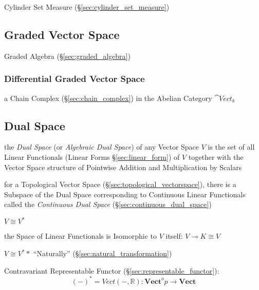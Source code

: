 Cylinder Set Measure (\S\ref{sec:cylinder_set_measure})



\subsection{Graded Vector Space}\label{sec:graded_vectorspace}

Graded Algebra (\S\ref{sec:graded_algebra})



\subsubsection{Differential Graded Vector Space}\label{sec:differential_graded}

a Chain Complex (\S\ref{sec:chain_complex}) in the Abelian Category
$\cat{Vect}_k$



\subsection{Dual Space}\label{sec:dual_space}

the \emph{Dual Space} (or \emph{Algebraic Dual Space}) of any Vector Space $V$
is the set of all Linear Functionals (Linear Forms \S\ref{sec:linear_form}) of
$V$ together with the Vector Space structure of Pointwise Addition and
Multiplication by Scalars

for a Topological Vector Space (\S\ref{sec:topological_vectorspace}), there is
a Subspace of the Dual Space corresponding to Continuous Linear Functionals
called the \emph{Continuous Dual Space} (\S\ref{sec:continuous_dual_space})

$V \cong V^*$

the Space of Linear Functionals is Isomorphic to $V$ itself:
$V \multimap K \cong V$

$V \cong V^**$ ``Naturally'' (\S\ref{sec:natural_transformation})

Contravariant Representable Functor
(\S\ref{sec:representable_functor}):
\[
  (-)^* = Vect(-,\mathbb{R}) :
    \mathbf{Vect}^op \rightarrow \mathbf{Vect}
\]

